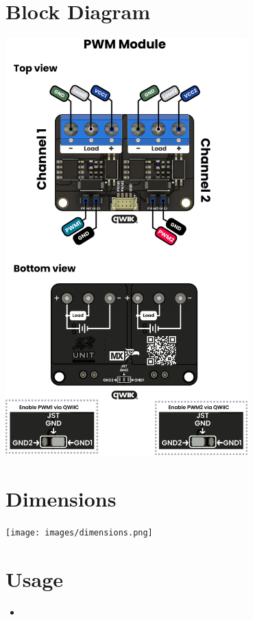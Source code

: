 \documentclass[10pt]{article}
\begin{document}
\section*{Block Diagram}
\vspace{1em}
\begin{center}
\includegraphics[width=0.70\textwidth,keepaspectratio]{images/function-diagram.jpg}
\end{center}
\newpage
\vspace*{3em}
\section*{Dimensions}
\vspace{1em}
\begin{center}
\texttt{[image: images/dimensions.png]}
\end{center}



\section*{Usage}
\begin{itemize}
\item 
\end{itemize}
\end{document}
